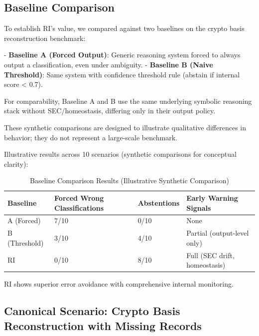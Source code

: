 \documentclass[12pt,a4paper]{article}
\begin{document}
\subsection{Baseline Comparison}

To establish RI's value, we compared against two baselines on the crypto basis reconstruction benchmark:

- \textbf{Baseline A (Forced Output)}: Generic reasoning system forced to always output a classification, even under ambiguity.
- \textbf{Baseline B (Naive Threshold)}: Same system with confidence threshold rule (abstain if internal score < 0.7).

For comparability, Baseline A and B use the same underlying symbolic reasoning stack without SEC/homeostasis, differing only in their output policy.

These synthetic comparisons are designed to illustrate qualitative differences in behavior; they do not represent a large-scale benchmark.

Illustrative results across 10 scenarios (synthetic comparisons for conceptual clarity):

\begin{table}[H]
\centering
\captionsetup{justification=raggedright, singlelinecheck=false}
\caption{Baseline Comparison Results (Illustrative Synthetic Comparison)}
\label{tab:baseline_comparison}

\begin{tabular}{@{}l
                p{3.0cm}
                p{2.2cm}
                p{3.2cm}@{}}
\toprule
\textbf{Baseline} &
\textbf{Forced Wrong Classifications} &
\textbf{Abstentions} &
\textbf{Early Warning Signals} \\
\midrule
A (Forced)      & 7/10 & 0/10 & None \\
B (Threshold)   & 3/10 & 4/10 & Partial (output-level only) \\
RI              & 0/10 & 8/10 & Full (SEC drift, homeostasis) \\
\bottomrule
\end{tabular}
\end{table}


RI shows superior error avoidance with comprehensive internal monitoring.

\subsection{Canonical Scenario: Crypto Basis Reconstruction with Missing Records}
\end{document}
